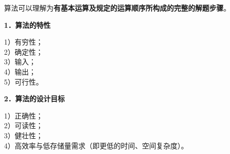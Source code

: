 {算法可以理解为}\textbf{{有基本运算及规定的运算顺序所构成的完整的解题步骤}}{。}

\textbf{{1．算法的特性}}

1）有穷性；\\
2）确定性；\\
3）输入；\\
4）输出；\\
5）可行性。

\textbf{2．算法的设计目标}

{ 1）正确性；}\\
{ 2）可读性；}\\
{ 3）健壮性；}\\
{ 4）高效率与低存储量需求（即更低的时间、空间复杂度）。}\\
